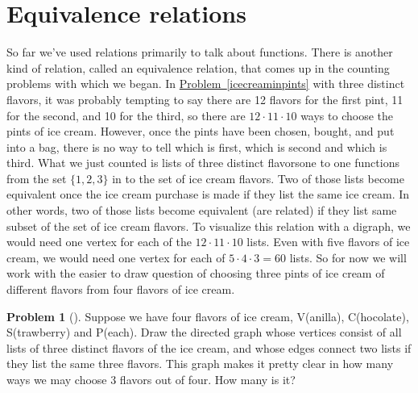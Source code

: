 \documentclass[10pt,]{book}
\theoremstyle{plain}
\theoremstyle{definition}
\newtheorem{activity}[project]{Problem}
\theoremstyle{definition}
\numberwithin{equation}{chapter}
\begin{document}
\section[{Equivalence relations}]{Equivalence relations}\label{equivalencerelations}
So far we've used relations primarily to talk about functions. There is another kind of relation, called an equivalence relation, that comes up in the counting problems with which we began. In \hyperref[icecreaminpints]{Problem~\ref{icecreaminpints}} with three distinct flavors, it was probably tempting to say there are 12 flavors for the first pint, 11 for the second, and 10 for the third, so there are \(12\cdot 11\cdot 10\) ways to choose the pints of ice cream. However, once the pints have been chosen, bought, and put into a bag, there is no way to tell which is first, which is second and which is third. What we just counted is lists of three distinct flavors\textemdash{}one to one functions from the set \(\{1,2,3\}\) in to the set of ice cream flavors. Two of those lists become equivalent once the ice cream purchase is made if they list the same ice cream. In other words, two of those lists become equivalent (are related) if they list same subset of the set of ice cream flavors. To visualize this relation with a digraph, we would need one vertex for each of the \(12\cdot 11\cdot 10\) lists. Even with five flavors of ice cream, we would need one vertex for each of \(5\cdot4\cdot3=60\) lists. So for now we will work with the easier to draw question of choosing three pints of ice cream of different flavors from four flavors of ice cream.%
\begin{activity}[]\marginsymbol[-1em]{} \label{fourchoosethree}
Suppose we have four flavors of ice cream, V(anilla), C(hocolate), S(trawberry) and P(each). Draw the directed graph whose vertices consist of all lists of three distinct flavors of the ice cream, and whose edges connect two lists if they list the same three flavors. This graph makes it pretty clear in how many ways we may choose 3 flavors out of four. How many is it?%
\end{activity}
\end{document}
